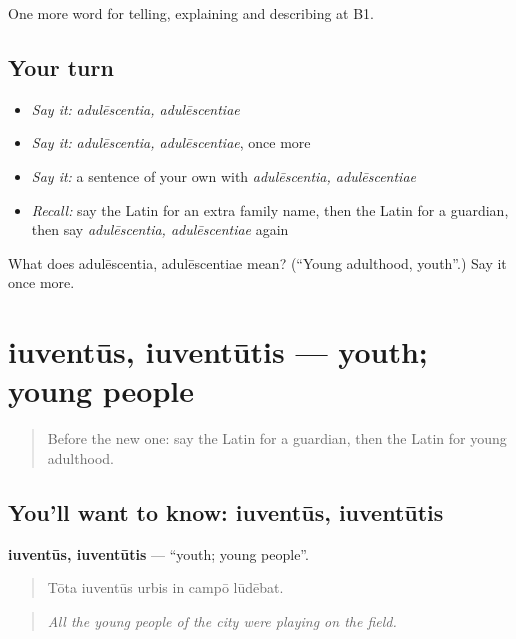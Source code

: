 \begin{grammarlens}[title={What you've built}]
One more word for telling, explaining and describing at B1.
\end{grammarlens}

\subsection*{Your turn}
\begin{itemize}
\raggedright
  \item \emph{Say it:} \emph{adulēscentia, adulēscentiae}
  \item \emph{Say it:} \emph{adulēscentia, adulēscentiae}, once more
  \item \emph{Say it:} a sentence of your own with \emph{adulēscentia, adulēscentiae}
  \item \emph{Recall:} say the Latin for an extra family name, then the Latin for a guardian, then say \emph{adulēscentia, adulēscentiae} again
\end{itemize}

\begin{tcolorbox}[breakable,colback=teal!4,colframe=teal!35!black,title={Before you move on}]
What does adulēscentia, adulēscentiae mean? (\textquotedblleft{}Young adulthood, youth\textquotedblright{}.) Say it once more.
\end{tcolorbox}
\section[iuventūs, iuventūtis]{iuventūs, iuventūtis — youth; young people}

\label{lesson:LA-C326-iuventus}



\begin{quote}
Before the new one: say the Latin for a guardian, then the Latin for young adulthood.
\end{quote}

\subsection*{You'll want to know: iuventūs, iuventūtis}
\textbf{iuventūs, iuventūtis} — \textquotedblleft{}youth; young people\textquotedblright{}.

\begin{quote}
Tōta iuventūs urbis in campō lūdēbat.
\end{quote}

\begin{quote}
\emph{All the young people of the city were playing on the field.}
\end{quote}

